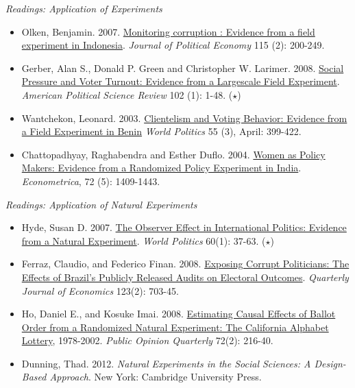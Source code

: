 \documentclass{article}
\begin{document}
\emph{Readings: Application of Experiments}
\begin{itemize}
  \item Olken, Benjamin. 2007. \href{http://www.journals.uchicago.edu/doi/abs/10.1086/517935}{Monitoring corruption : Evidence from a field experiment in Indonesia}. \textit{Journal of Political Economy} 115 (2): 200-249.
  \item Gerber, Alan S., Donald P. Green and Christopher W. Larimer. 2008. \href{http://journals.cambridge.org/action/displayAbstract?fromPage=online&aid=1720748}{Social Pressure and Voter Turnout: Evidence from a Largescale Field Experiment}. \textit{American Political Science Review} 102 (1): 1-48. ($\star$)
\item Wantchekon, Leonard. 2003. \href{http://www.jstor.org/stable/25054228} {Clientelism and Voting Behavior: Evidence from a Field Experiment in Benin} \textit{World Politics} 55 (3), April: 399-422.
  \item Chattopadhyay, Raghabendra and Esther Duflo. 2004.  \href{http://www.jstor.org/stable/3598894} {Women as Policy Makers: Evidence from a Randomized Policy Experiment in India}. \textit{Econometrica}, 72 (5): 1409-1443.
  \end{itemize}

  \emph{Readings: Application of Natural Experiments}
\begin{itemize}
\item Hyde, Susan D. 2007.  \href{http://muse.jhu.edu/journals/world_politics/v060/60.1.hyde.html} {The Observer Effect in International Politics: Evidence
from a Natural Experiment}. \textit{World Politics} 60(1): 37-63. ($\star$)
\item Ferraz, Claudio, and Federico Finan. 2008.  \href{http://qje.oxfordjournals.org/content/123/2/703.short%E2%80%8E} {Exposing Corrupt Politicians: The
Effects of Brazil's Publicly Released Audits on Electoral Outcomes}. \textit{Quarterly
Journal of Economics} 123(2): 703-45.
\item Ho, Daniel E., and Kosuke Imai. 2008.  \href{http://poq.oxfordjournals.org/cgi/content/abstract/72/2/216} {Estimating Causal Effects of Ballot
Order from a Randomized Natural Experiment: The California Alphabet Lottery},
1978-2002.\textit{ Public Opinion Quarterly} 72(2): 216-40.
\item Dunning, Thad. 2012. \textit{Natural Experiments in the Social Sciences: A Design-Based Approach}. New York: Cambridge University Press.
\end{itemize}
\end{document}
